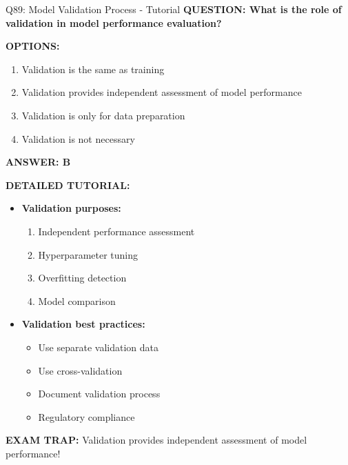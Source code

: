 \documentclass[8pt]{beamer}
\begin{document}
\begin{frame}{Q89: Model Validation Process - Tutorial}
	\fontsize{6.5}{7.5}\selectfont
	\textbf{QUESTION: What is the role of validation in model performance evaluation?}
	
	\vspace{0.1cm}
	\textbf{OPTIONS:}
	\begin{enumerate}
		\item Validation is the same as training
		\item Validation provides independent assessment of model performance
		\item Validation is only for data preparation
		\item Validation is not necessary
	\end{enumerate}
	
	\vspace{0.1cm}
	\textcolor{myblue}{\textbf{ANSWER: B}}
	
	\vspace{0.1cm}
	\textbf{DETAILED TUTORIAL:}
	\begin{itemize}
		\item \textbf{Validation purposes:}
		\begin{enumerate}
			\item Independent performance assessment
			\item Hyperparameter tuning
			\item Overfitting detection
			\item Model comparison
		\end{enumerate}
		\item \textbf{Validation best practices:}
		\begin{itemize}
			\item Use separate validation data
			\item Use cross-validation
			\item Document validation process
			\item Regulatory compliance
		\end{itemize}
	\end{itemize}
	
	\textcolor{myred}{\textbf{EXAM TRAP:}} Validation provides \textcolor{myblue}{independent assessment} of model performance!
\end{frame}
\end{document}
